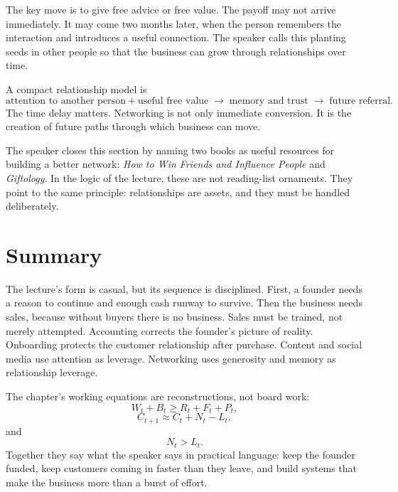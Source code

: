 The key move is to give free advice or free value. The payoff may not arrive immediately. It may come two months later, when the person remembers the interaction and introduces a useful connection. The speaker calls this planting seeds in other people so that the business can grow through relationships over time.

A compact relationship model is
\[
\text{attention to another person}
+
\text{useful free value}
\;\longrightarrow\;
\text{memory and trust}
\;\longrightarrow\;
\text{future referral}.
\]
The time delay matters. Networking is not only immediate conversion. It is the creation of future paths through which business can move.

The speaker closes this section by naming two books as useful resources for building a better network: \emph{How to Win Friends and Influence People} and \emph{Giftology}. In the logic of the lecture, these are not reading-list ornaments. They point to the same principle: relationships are assets, and they must be handled deliberately.

\section{Summary}

The lecture's form is casual, but its sequence is disciplined. First, a founder needs a reason to continue and enough cash runway to survive. Then the business needs sales, because without buyers there is no business. Sales must be trained, not merely attempted. Accounting corrects the founder's picture of reality. Onboarding protects the customer relationship after purchase. Content and social media use attention as leverage. Networking uses generosity and memory as relationship leverage.

The chapter's working equations are reconstructions, not board work:
\[
W_t + B_t \geq R_t + F_t + P_t,
\]
\[
C_{t+1} \approx C_t + N_t - L_t,
\]
and
\[
N_t > L_t.
\]
Together they say what the speaker says in practical language: keep the founder funded, keep customers coming in faster than they leave, and build systems that make the business more than a burst of effort.